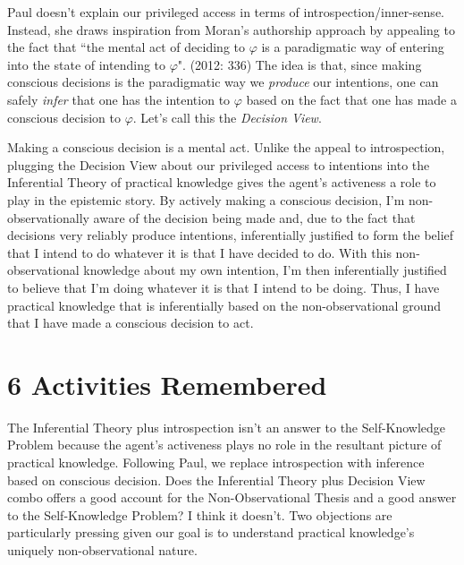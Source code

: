\documentclass[a4paper,12pt]{article}
\begin{document}

Paul doesn't explain our privileged access in terms of introspection/inner-sense. Instead, she draws inspiration from Moran's authorship approach by appealing to the fact that ``the mental act of deciding to $\varphi$ is a paradigmatic way of entering into the state of intending to $\varphi$". (2012: 336) The idea is that, since making conscious decisions is the paradigmatic way we \emph{produce} our intentions, one can safely \emph{infer} that one has the intention to $\varphi$ based on the fact that one has made a conscious decision to $\varphi$. Let's call this the \emph{Decision View}.

Making a conscious decision is a mental act. Unlike the appeal to introspection, plugging the Decision View about our privileged access to intentions into the Inferential Theory of practical knowledge gives the agent's activeness a role to play in the epistemic story. By actively making a conscious decision, I'm non-observationally aware of the decision being made and, due to the fact that decisions very reliably produce intentions, inferentially justified to form the belief that I intend to do whatever it is that I have decided to do. With this non-observational knowledge about my own intention, I'm then inferentially justified to believe that I'm doing whatever it is that I intend to be doing. Thus, I have practical knowledge that is inferentially based on the non-observational ground that I have made a conscious decision to act.

\section*{6 Activities Remembered}

The Inferential Theory plus introspection isn't an answer to the Self-Knowledge Problem because the agent's activeness plays no role in the resultant picture of practical knowledge. Following Paul, we replace introspection with inference based on conscious decision. Does the Inferential Theory plus Decision View combo offers a good account for the Non-Observational Thesis and a good answer to the Self-Knowledge Problem? I think it doesn't. Two objections are particularly pressing given our goal is to understand practical knowledge's uniquely non-observational nature.
\end{document}
